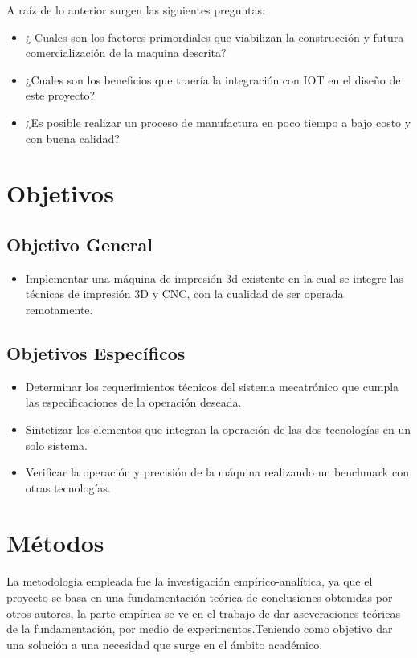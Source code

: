 A raíz de lo anterior surgen las siguientes preguntas:
\begin{itemize}
\item ¿ Cuales son los factores primordiales que viabilizan la construcción y futura comercialización de la maquina descrita?
	\item ¿Cuales son los beneficios que traería la integración con IOT en el diseño de este proyecto?
	\item ¿Es posible realizar un proceso de manufactura en poco tiempo a bajo costo y con buena calidad?
\end{itemize}


\section{Objetivos}

\subsection{Objetivo General}

\begin{itemize}
	\item Implementar una máquina de impresión 3d existente en la cual se integre las técnicas de impresión 3D y CNC, con la cualidad de ser operada remotamente.
\end{itemize}

\subsection{Objetivos Específicos}
\begin{itemize}
	\item Determinar los requerimientos técnicos del sistema mecatrónico que cumpla las especificaciones de la operación deseada.
	\item Sintetizar los elementos que integran la operación de las dos tecnologías en un solo sistema. 
	\item Verificar la operación y precisión de la máquina realizando un benchmark con otras tecnologías.
\end{itemize}



\section{Métodos}



La metodología empleada fue la investigación empírico-analítica, ya que el proyecto se basa en una fundamentación teórica de conclusiones obtenidas por otros autores, la parte empírica se ve en el trabajo de dar aseveraciones teóricas de la fundamentación, por medio de experimentos.Teniendo como objetivo dar una solución a una necesidad que surge en el ámbito académico.\\

